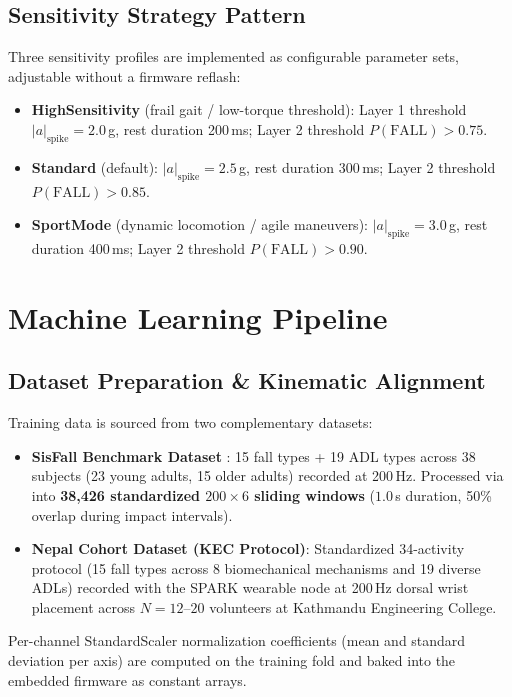 \subsection{Sensitivity Strategy Pattern}
\label{sec:strategy}

Three sensitivity profiles are implemented as configurable parameter sets, adjustable without a firmware reflash:

\begin{itemize}
    \item \textbf{HighSensitivity} (frail gait / low-torque threshold): Layer 1 threshold \(|a|_{\text{spike}} = 2.0\)\,g, rest duration 200\,ms; \allowbreak Layer 2 threshold \(P(\text{FALL}) \allowbreak > 0.75\).
    \item \textbf{Standard} (default): \(|a|_{\text{spike}} = 2.5\)\,g, rest duration 300\,ms; \allowbreak Layer 2 threshold \(P(\text{FALL}) \allowbreak > 0.85\).
    \item \textbf{SportMode} (dynamic locomotion / agile maneuvers): \(|a|_{\text{spike}} = 3.0\)\,g, rest duration 400\,ms; \allowbreak Layer 2 threshold \(P(\text{FALL}) \allowbreak > 0.90\).
\end{itemize}

\section{Machine Learning Pipeline}

\subsection{Dataset Preparation \& Kinematic Alignment}

Training data is sourced from two complementary datasets:
\begin{itemize}
    \item \textbf{SisFall Benchmark Dataset} \cite{sucerquia2017sisfall}: 15 fall types + 19 ADL types across 38 subjects (23 young adults, 15 older adults) recorded at 200\,Hz. Processed via  into \textbf{38,426 standardized \(200 \times 6\) sliding windows} (\(1.0\)\,s duration, 50\% overlap during impact intervals).
    \item \textbf{Nepal Cohort Dataset (KEC Protocol)}: Standardized 34-activity protocol (15 fall types across 8 biomechanical mechanisms and 19 diverse ADLs) recorded with the SPARK wearable node at 200\,Hz dorsal wrist placement across \(N=12\text{--}20\) volunteers at Kathmandu Engineering College.
\end{itemize}
Per-channel StandardScaler normalization coefficients (mean and standard deviation per axis) are computed on the training fold and baked into the embedded firmware as constant arrays.

